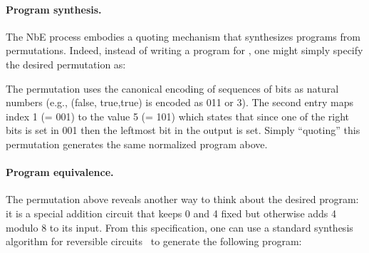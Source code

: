 

\paragraph*{Program synthesis.} The NbE process embodies a quoting mechanism that synthesizes programs from
permutations. Indeed, instead of writing a program for , one might simply specify the desired permutation as:

\resetperm{}

\noindent The permutation uses the canonical encoding of sequences of bits as natural numbers (e.g., (\textsf{false},
\textsf{true},\textsf{true}) is encoded as 011 or 3).  The second entry maps index 1 (= 001) to the value 5 (= 101)
which states that since one of the right bits is set in 001 then the leftmost bit in the output is set. Simply
``quoting'' this permutation generates the same normalized program  above.

\paragraph*{Program equivalence.} The permutation above reveals another way to think about the desired program: it is a
special addition circuit that keeps 0 and 4 fixed but otherwise adds 4 modulo 8 to its input. From this specification,
one can use a standard synthesis algorithm for reversible circuits~\cite{10.1145/775832.775915} to generate the
following program:

